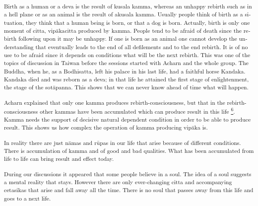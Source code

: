 \textsuperscript{\textdutch{Birth as a human or a deva is the result of
kusala kamma, whereas an unhappy rebirth such as in a hell plane or as
an animal is the result of akusala kamma. Usually people think of birth
as a situation, they think that a human being is born, or that a dog is
born. Actually, birth is only one moment of citta, vipākacitta produced
by kamma. People tend to be afraid of death since the rebirth following
upon it may be unhappy. If one is born as an animal one cannot develop
the understanding that eventually leads to the end of all defilements
and to the end rebirth. It is of no use to be afraid since it depends on
conditions what will be the next rebirth. This was one of the topics of
discussion in Taiwan before the sessions started with Acharn and the
whole group. The Buddha, when he, as a Bodhisatta, left his palace in
his last life, had a faithful horse Kandaka. Kandaka died and was reborn
as a deva; in that life he attained the first stage of enlightenment,
the stage of the sotāpanna. This shows that we can never know ahead of
time what will happen. }}

\textsuperscript{\textportuguese{Acharn}\textdutch{ explained that
}\textenglish[variant=american]{only one kamma produces
rebirth-consciousness, but }\textdutch{that in the rebirth-consciousness
}\textenglish[variant=american]{other kammas}\textdutch{ have been
accumulated}\textenglish[variant=american]{ which can produce result in
this life}\textdutch{
\protect\hyperlink{sdfootnote6sym}{\textsuperscript{6}}}.
\textdutch{Kamma needs the support of decisive natural dependent
condition in order to be able to produce result. This shows us how
complex the operation of kamma producing vipāka is. }}

\textsuperscript{\textenglish[variant=american]{In reality there are
just n}\textdutch{ā}\textenglish[variant=american]{mas and
r}\textdutch{ū}\textenglish[variant=american]{pas in our life that arise
because of different conditions. There is
accum}\textdutch{u}\textenglish[variant=american]{lation of kamma and of
good and bad qualities. What has been accumulated from life to life can
bring result and effect today. }}

\textsuperscript{\textenglish[variant=american]{During our discussions
it appeared that some people believe in a soul. The idea of a soul
suggests a mental reality that stays. However there are only
ever-changing citta and accompanying cetasikas that arise and fall away
all the time. There is no soul that passes away from this life and goes
to a next life.}}

